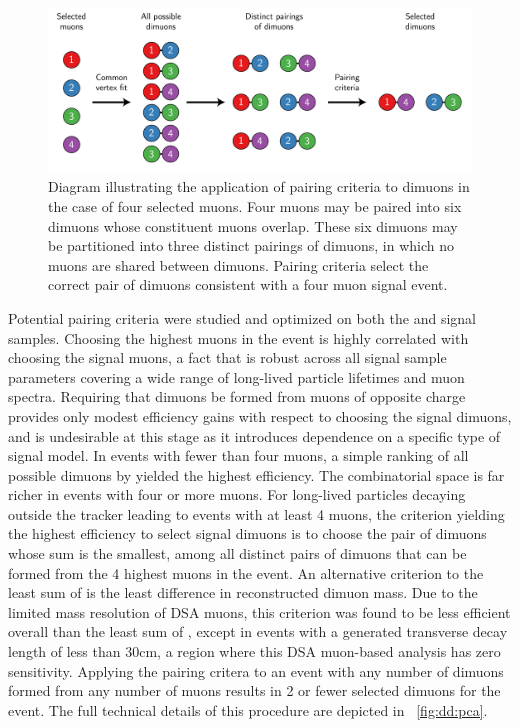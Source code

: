 \begin{figure}[htpb]
  \centering
  \includegraphics[width=\textwidth]{figures/displaced/PairingCriteriaDiagram.pdf}
  \caption{Diagram illustrating the application of pairing criteria to dimuons in the case of four selected muons. Four muons may be paired into six dimuons whose constituent muons overlap. These six dimuons may be partitioned into three distinct pairings of dimuons, in which no muons are shared between dimuons. Pairing criteria select the correct pair of dimuons consistent with a four muon signal event.}
  \label{fig:dd:pc}
\end{figure}

Potential pairing criteria were studied and optimized on both the \twoMu and \fourMu signal samples.
Choosing the highest \pT muons in the event is highly correlated with choosing the signal muons, a fact that is robust across all signal sample parameters covering a wide range of long-lived particle lifetimes and muon \pT spectra.
Requiring that dimuons be formed from muons of opposite charge provides only modest efficiency gains with respect to choosing the signal dimuons, and is undesirable at this stage as it introduces dependence on a specific type of signal model.
In events with fewer than four muons, a simple ranking of all possible dimuons by \vchisq yielded the highest efficiency.
The combinatorial space is far richer in events with four or more muons.
For long-lived particles decaying outside the tracker leading to events with at least 4 muons, the criterion yielding the highest efficiency to select signal dimuons is to choose the pair of dimuons whose \vchisq sum is the smallest, among all distinct pairs of dimuons that can be formed from the 4 highest \pT muons in the event. 
An alternative criterion to the least sum of \vchisq is the least difference in reconstructed dimuon mass.
Due to the limited mass resolution of DSA muons, this criterion was found to be less efficient overall than the least sum of \vchisq, except in events with a generated transverse decay length of less than 30\unit{cm}, a region where this DSA muon-based analysis has zero sensitivity.
Applying the pairing critera to an event with any number of dimuons formed from any number of muons results in 2 or fewer selected dimuons for the event.
The full technical details of this procedure are depicted in \Fig~\ref{fig:dd:pca}.

